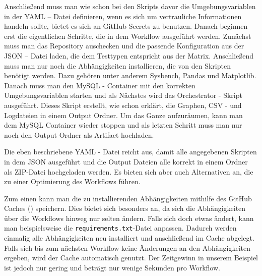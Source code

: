 

Anschließend muss man wie schon bei den Skripts davor die Umgebungsvariablen in der YAML – Datei definieren, wenn es sich um vertrauliche Informationen handeln sollte, bietet es sich an GitHub Secrets zu benutzen.
Danach beginnen erst die eigentlichen Schritte, die in dem Workflow ausgeführt werden.
Zunächst muss man das Repository auschecken und die passende Konfiguration aus der JSON – Datei laden, die dem Testtypen entspricht aus der Matrix.
Anschließend muss man nur noch die Abhängigkeiten installieren, die von den Skripten benötigt werden.
Dazu gehören unter anderem Sysbench, Pandas und Matplotlib.
Danach muss man den MySQL - Container mit den korrekten Umgebungsvariablen starten und als Nächstes wird das Orchestrator - Skript ausgeführt.
Dieses Skript erstellt, wie schon erklärt, die Graphen, CSV - und Logdateien in einem Output Ordner.
Um das Ganze aufzuräumen, kann man dem MySQL Container wieder stoppen und als letzten Schritt muss man nur noch den Output Ordner als Artifact hochladen.



Die eben beschriebene YAML - Datei reicht aus, damit alle angegebenen Skripten in dem JSON ausgeführt und die Output Dateien alle korrekt in einem Ordner als ZIP-Datei hochgeladen werden.
Es bieten sich aber auch Alternativen an, die zu einer Optimierung des Workflows führen.

Zum einen kann man die zu installierenden Abhängigkeiten mithilfe des GitHub Caches (\cite{github_cache_doku}) speichern.
Dies bietet sich besonders an, da sich die Abhängigkeiten über die Workflows hinweg nur selten ändern.
Falls sich doch etwas ändert, kann man beispielsweise die \texttt{require\allowbreak ments.txt}-Datei anpassen.
Dadurch werden einmalig alle Abhängigkeiten neu installiert und anschließend im Cache abgelegt.
Falls sich bis zum nächsten Workflow keine Änderungen an den Abhängigkeiten ergeben, wird der Cache automatisch genutzt. 
Der Zeitgewinn in unserem Beispiel ist jedoch nur gering und beträgt nur wenige Sekunden pro Workflow.



